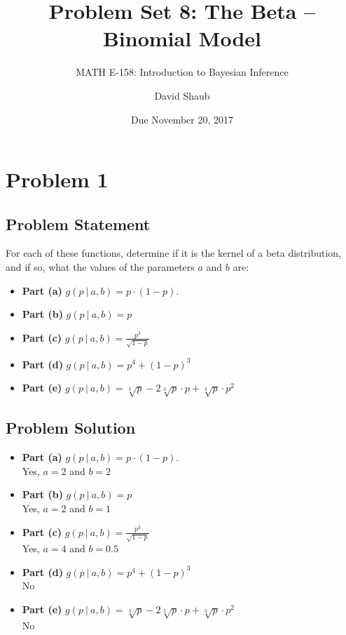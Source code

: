 \documentclass[12pt]{article}
\title{Problem Set 8: The Beta -- Binomial Model}
\author{MATH E-158: Introduction to Bayesian Inference}
\author{David Shaub}
\date{Due November 20, 2017}
\theoremstyle{definition}
\begin{document}
	
	\maketitle


\section*{Problem 1}


\subsection*{Problem Statement}

\bigskip
For each of these functions, determine if it is the kernel of a beta distribution, and if so, what the values of the parameters $a$ and $b$ are:
\begin{itemize}
	\item {\bf Part (a)} $g(p\ |\ a,b) = p \cdot (1 - p)$.
	\item {\bf Part (b)} $g(p\ |\ a,b) = p$
	\item {\bf Part (c)} $g(p\ |\ a,b) = \displaystyle \frac{ p^3}{\sqrt{1 - p} }$
	\item {\bf Part (d)} $g(p\ |\ a,b) = p^4 + (1 - p)^3$
	\item {\bf Part (e)} $g(p\ |\ a,b) = \sqrt[3]{p} - 2 \sqrt[3]{p} \cdot p + \sqrt[3]{p} \cdot p^2 $
\end{itemize}



\subsection*{Problem Solution}
\begin{itemize}
	\item {\bf Part (a)} $g(p\ |\ a,b) = p \cdot (1 - p)$.\\
	Yes, $a=2$ and $b=2$
	\item {\bf Part (b)} $g(p\ |\ a,b) = p$\\
	Yes, $a=2$ and $b=1$
	\item {\bf Part (c)} $g(p\ |\ a,b) = \displaystyle \frac{ p^3}{\sqrt{1 - p} }$\\
	Yes, $a=4$ and $b=0.5$
	\item {\bf Part (d)} $g(p\ |\ a,b) = p^4 + (1 - p)^3$\\
	No
	\item {\bf Part (e)} $g(p\ |\ a,b) = \sqrt[3]{p} - 2 \sqrt[3]{p} \cdot p + \sqrt[3]{p} \cdot p^2 $\\
	No
\end{itemize}
\end{document}
